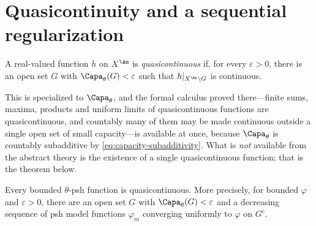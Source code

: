 \section{Quasicontinuity and a sequential regularization}
\label{sec:ch25-quasicontinuity}

\begin{definition}
\label{def:ch25-quasicontinuous}
A real-valued function \(h\) on \(X^{\An}\) is
\emph{quasicontinuous} if, for every \(\varepsilon>0\), there is an open set
\(G\) with \(\Capa_\theta(G)<\varepsilon\) such that
\(h|_{X^{\An}\setminus G}\) is continuous.
\end{definition}

This is  specialized to \(\Capa_\theta\), and the
formal calculus proved there---finite sums, maxima, products and uniform
limits of quasicontinuous functions are quasicontinuous, and countably many
of them may be made continuous outside a single open set of small
capacity---is available at once, because \(\Capa_\theta\) is countably
subadditive by \eqref{eq:capacity-subadditivity}.  What is \emph{not}
available from the abstract theory is the existence of a single
quasicontinuous function; that is the theorem below.

\begin{theorem}
\label{thm:bounded-quasicontinuity}
Every bounded \(\theta\)-psh function is quasicontinuous. More precisely,
for bounded \(\varphi\) and \(\varepsilon>0\), there are an open set \(G\)
with \(\Capa_\theta(G)<\varepsilon\) and a decreasing sequence of psh model
functions \(\varphi_m\) converging uniformly to \(\varphi\) on \(G^c\).
\end{theorem}

